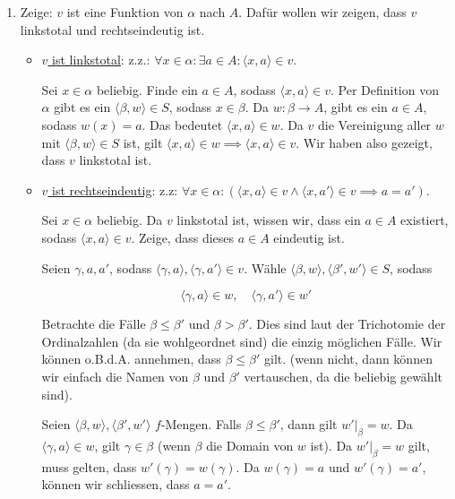 \documentclass[12pt]{article}
\begin{document}
\begin{enumerate}[label=(\alph*)]
    \item Zeige: $v$ ist eine Funktion von $\alpha$ nach $A$. Dafür wollen wir zeigen, dass $v$ linkstotal und rechtseindeutig ist.
    
    \begin{itemize}
        \item \underline{$v$ ist linkstotal}: z.z.: $\forall x \in \alpha : \exists a \in A : \langle x, a \rangle \in v$.
        
        Sei $x \in \alpha$ beliebig. Finde ein $a \in A$, sodass $\langle x, a \rangle \in v$. Per Definition von $\alpha$ gibt es ein $\langle \beta, w \rangle \in S$, sodass $x \in \beta$. Da $w: \beta \rightarrow A$, gibt es ein $a \in A$, sodass $w(x) = a$. Das bedeutet $\langle x, a \rangle \in w$. Da $v$ die Vereinigung aller $w$ mit $\langle \beta, w \rangle \in S$ ist, gilt $\langle x, a \rangle \in w \implies \langle x, a \rangle \in v$. Wir haben also gezeigt, dass $v$ linkstotal ist.

        \item \underline{$v$ ist rechtseindeutig}: z.z: $\forall x \in \alpha : \left(\langle x, a \rangle \in v \land \langle x, a' \rangle \in v \implies a = a'\right)$.
        
        Sei $x \in \alpha$ beliebig. Da $v$ linkstotal ist, wissen wir, dass ein $a \in A$ existiert, sodass $\langle x, a \rangle \in v$. Zeige, dass dieses $a \in A$ eindeutig ist.

        Seien $\gamma, a, a'$, sodass $\langle \gamma, a \rangle, \langle \gamma, a' \rangle \in v.$ Wähle $\langle \beta, w \rangle, \langle \beta', w' \rangle \in S$, sodass 

        $$
            \langle \gamma, a \rangle \in w, \quad \langle \gamma, a' \rangle \in w'
        $$

        Betrachte die Fälle $\beta \leq \beta'$ und $\beta > \beta'$. Dies sind laut der Trichotomie der Ordinalzahlen (da sie wohlgeordnet sind) die einzig möglichen Fälle. Wir können o.B.d.A. annehmen, dass $\beta \leq \beta'$ gilt. (wenn nicht, dann können wir einfach die Namen von $\beta$ und $\beta'$ vertauschen, da die beliebig gewählt sind).
        
        Seien $\langle \beta, w \rangle, \langle \beta', w' \rangle$  $f$-Mengen. Falls $\beta \leq \beta'$, dann gilt $w'|_\beta = w$. Da $\langle \gamma, a \rangle \in w$, gilt $\gamma \in \beta$ (wenn $\beta$ die Domain von $w$ ist). Da $w'|_\beta = w$ gilt, muss gelten, dass $w'(\gamma) = w(\gamma)$. Da $w(\gamma) = a$ und $w'(\gamma) = a'$, können wir schliessen, dass $a = a'$. 


\end{itemize}
\end{enumerate}
\end{document}
